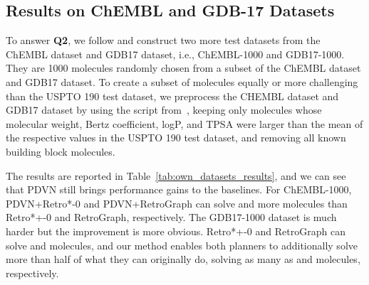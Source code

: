 \documentclass[nohyperref]{article}
\theoremstyle{plain}
\theoremstyle{definition}
\theoremstyle{remark}
\begin{document}
\subsection{Results on ChEMBL and GDB-17 Datasets}







To answer \textbf{Q2}, we follow \cite{tripp2022reevaluating} and construct two more test datasets from the ChEMBL dataset and GDB17 dataset, i.e., ChEMBL-1000 and GDB17-1000. 
They are 1000 molecules randomly chosen from a subset of the ChEMBL dataset and GDB17 dataset.
To create a subset of molecules equally or more challenging than the USPTO 190 test dataset, 
we preprocess the CHEMBL dataset and GDB17 dataset by using the script from~\cite{brown2019guacamol}, 
keeping only molecules whose 
molecular weight, Bertz coefficient, logP, and TPSA were larger than the mean of the respective values in the USPTO 190 test dataset, and removing all known building block molecules.





The results are reported in Table~\ref{tab:own_datasets_results}, and we can see that PDVN still brings performance gains to the baselines. For ChEMBL-1000, PDVN+Retro*-0 and PDVN+RetroGraph can solve  and  more molecules than Retro*+-0 and RetroGraph, respectively. The GDB17-1000 dataset is much harder but the improvement is more obvious. Retro*+-0 and RetroGraph can solve  and  molecules, and our method enables both planners to additionally solve more than half of what they can originally do, solving as many as  and  molecules, respectively.

\begin{table}[t]
\caption{Number of solved target molecules on ChEMBL-100 dataset and GDB17-1000 datasets.}
\label{tab:own_datasets_results}
\centering
{}
\end{table}
\end{document}
